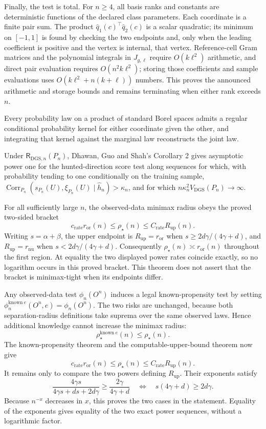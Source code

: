 Finally, the test is total.  For \(n\ge4\), all basis ranks and constants are deterministic functions of the declared class parameters.  Each coordinate is a finite pair sum.  The product \(\widehat q_1(c)^\top\widehat q_2(c)\) is a scalar quadratic; its minimum on \([-1,1]\) is found by checking the two endpoints and, only when the leading coefficient is positive and the vertex is internal, that vertex.  Reference-cell Gram matrices and the polynomial integrals in \(J_{g,\ell}\) require \(O(k\ell^2)\) arithmetic, and direct pair evaluation requires \(O(n^2k\ell^2)\); storing those coefficients and sample evaluations uses \(O(k\ell^2+n(k+\ell))\) numbers.  This proves the announced arithmetic and storage bounds and remains terminating when either rank exceeds \(n\).

Every probability law on a product of standard Borel spaces admits a regular conditional probability kernel for either coordinate given the other, and integrating that kernel against the marginal law reconstructs the joint law.

Under \(\mathsf R_{\mathrm{DGS},n}(P_n)\), Dhawan, Guo and Shah's Corollary 2 gives asymptotic power one for the hunted-direction score test along sequences for which, with probability tending to one conditionally on the training sample, \(\operatorname{Corr}_{P_n}(s_{P_n}(U),\xi_{P_n}(U)\mid\widehat h_n)>\kappa_n\), and for which \(n\kappa_n^2V_{\mathrm{DGS}}(P_n)\to\infty\).

For all sufficiently large \(n\), the observed-data minimax radius obeys the proved two-sided bracket
\[
 c_{\mathrm{rate}}r_{\mathrm{or}}(n)
 \le\rho_\star(n)
 \le C_{\mathrm{rate}}R_{\mathrm{up}}(n).
\]
Writing \(s=\alpha+\beta\), the upper endpoint is \(R_{\mathrm{up}}=r_{\mathrm{or}}\) when \(s\ge 2d\gamma/(4\gamma+d)\), and \(R_{\mathrm{up}}=r_{\mathrm{nu}}\) when \(s<2d\gamma/(4\gamma+d)\).  Consequently \(\rho_\star(n)\asymp r_{\mathrm{or}}(n)\) throughout the first region.  At equality the two displayed power rates coincide exactly, so no logarithm occurs in this proved bracket.  This theorem does not assert that the bracket is minimax-tight when its endpoints differ.

Any observed-data test \(\phi_n(O^n)\) induces a legal known-propensity test by setting \(\phi_n^{\mathrm{known}\ e}(O^n,e)=\phi_n(O^n)\).  The two risks are unchanged, because both separation-radius definitions take suprema over the same observed laws.  Hence additional knowledge cannot increase the minimax radius:
\[
 \rho_\star^{\mathrm{known}\ e}(n)\le\rho_\star(n).
\]
The known-propensity theorem and the computable-upper-bound theorem now give
\[
 c_{\mathrm{rate}}r_{\mathrm{or}}(n)
 \le\rho_\star(n)
 \le C_{\mathrm{rate}}R_{\mathrm{up}}(n).
\]
It remains only to compare the two powers defining \(R_{\mathrm{up}}\).  Their exponents satisfy
\[
 \frac{4\gamma s}{4\gamma s+ds+2d\gamma}
 \ge \frac{2\gamma}{4\gamma+d}
 \quad\Longleftrightarrow\quad
 s(4\gamma+d)\ge2d\gamma.
\]
Because \(n^{-x}\) decreases in \(x\), this proves the two cases in the statement.  Equality of the exponents gives equality of the two exact power sequences, without a logarithmic factor.

